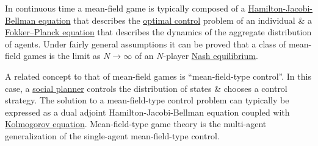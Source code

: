 \documentclass{article}
\begin{document}
In continuous time a mean-field game is typically composed of a \href{https://en.wikipedia.org/wiki/Hamilton%E2%80%93Jacobi%E2%80%93Bellman_equation}{Hamilton-Jacobi-Bellman equation} that describes the \href{https://en.wikipedia.org/wiki/Optimal_control}{optimal control} problem of an individual \& a \href{https://en.wikipedia.org/wiki/Fokker%E2%80%93Planck_equation}{Fokker--Planck equation} that describes the dynamics of the aggregate distribution of agents. Under fairly general assumptions it can be proved that a class of mean-field games is the limit as $N\to\infty$ of an $N$-player \href{https://en.wikipedia.org/wiki/Nash_equilibrium}{Nash equilibrium}.

A related concept to that of mean-field games is ``mean-field-type control''. In this case, a \href{https://en.wikipedia.org/wiki/Social_planner}{social planner} controls the distribution of states \& chooses a control strategy. The solution to a mean-field-type control problem can typically be expressed as a dual adjoint Hamilton-Jacobi-Bellman equation coupled with \href{https://en.wikipedia.org/wiki/Fokker%E2%80%93Planck_equation}{Kolmogorov equation}. Mean-field-type game theory is the multi-agent generalization of the single-agent mean-field-type control.
\end{document}
